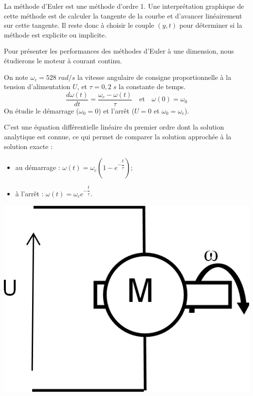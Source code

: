 \documentclass[10pt,fleqn]{article} %
\begin{document}
La méthode d’Euler est une méthode d’ordre 1. Une interprétation graphique de cette méthode est de calculer la tangente de la courbe et d’avancer linéairement sur cette tangente. Il reste donc à choisir le couple $(y,t)$ pour déterminer si la méthode est explicite ou implicite.

Pour présenter les performances des méthodes d’Euler à une dimension, nous étudierons le moteur à courant continu.

\begin{minipage}[c]{.65\linewidth}
On note $\omega_c = 528\; rad/s$ la vitesse angulaire de consigne proportionnelle à la tension d'alimentation $U$, et $\tau=0,2\; s$ la constante de temps.
$$ \dfrac{d\omega(t)}{dt} = \dfrac{\omega_c-\omega(t)}{\tau} \quad \text{et} \quad \omega(0)=\omega_0
$$
On étudie le démarrage ($\omega_0=0$) et l'arrêt ($U=0$ et $\omega_0=\omega_c$).

C’est une équation différentielle linéaire du premier ordre dont la solution analytique est connue, ce qui permet de comparer la solution approchée à la solution exacte :
\begin{itemize}
\item au démarrage : $\omega(t)=\omega_c\left(1-e^{-\dfrac{t}{\tau}}\right)$;
\item à l'arrêt : $\omega(t)=\omega_c e^{-\dfrac{t}{\tau}}$.
\end{itemize}


\end{minipage} \hfill
\begin{minipage}[c]{.3\linewidth}
\begin{center}
\includegraphics[width=.95\textwidth]{images/fig_01}
\end{center}
\end{minipage}
\end{document}

